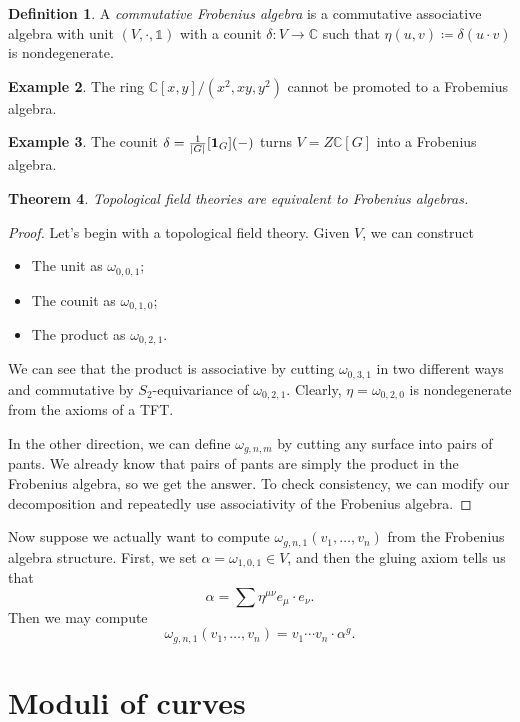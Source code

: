 \documentclass[leqno, openany]{memoir}
\newtheorem{thm}{Theorem}[section]
\theoremstyle{definition}
\newtheorem{defn}[thm]{Definition}
\newtheorem{exm}[thm]{Example}
\theoremstyle{remark}
\theoremstyle{plain}
\theoremstyle{definition}
\theoremstyle{remark}
\newcommand{\C}{\mathbb{C}}
\begin{document}
\begin{defn}
A \textit{commutative Frobenius algebra} is a commutative associative algebra with unit $(V, \cdot, \mathbb{1})$ with a counit $\delta \colon V \to \C$ such that $\eta(u,v) \coloneqq \delta(u \cdot v)$ is nondegenerate.
\end{defn}

\begin{exm}
The ring $\C[x,y]/(x^2,xy,y^2)$ cannot be promoted to a Frobemius algebra.
\end{exm}

\begin{exm}
The counit $\delta = \frac{1}{\abs{G}}[\mathbf{1}_G](-)$ turns $V = Z \C[G]$ into a Frobenius algebra.
\end{exm}

\begin{thm}
Topological field theories are equivalent to Frobenius algebras.
\end{thm}

\begin{proof}
  Let's begin with a topological field theory. Given $V$, we can construct
  \begin{itemize}
  \item The unit as $\omega_{0,0,1}$;
  \item The counit as $\omega_{0,1,0}$;
  \item The product as $\omega_{0,2,1}$.
  \end{itemize}
  We can see that the product is associative by cutting $\omega_{0,3,1}$ in two different ways and commutative by $S_2$-equivariance of $\omega_{0,2,1}$. Clearly, $\eta = \omega_{0,2,0}$ is nondegenerate from the axioms of a TFT.

  In the other direction, we can define $\omega_{g,n,m}$ by cutting any surface into pairs of pants. We already know that pairs of pants are simply the product in the Frobenius algebra, so we get the answer. To check consistency, we can modify our decomposition and repeatedly use associativity of the Frobenius algebra.
\end{proof}

Now suppose we actually want to compute $\omega_{g,n,1}(v_1, \ldots, v_n)$ from the Frobenius algebra structure. First, we set $\alpha = \omega_{1,0,1} \in V$, and then the gluing axiom tells us that
\[ \alpha = \sum \eta^{\mu \nu} e_{\mu} \cdot e_{\nu}. \]
Then we may compute
\[ \omega_{g,n,1}(v_1, \ldots, v_n) = v_1 \cdots v_n \cdot \alpha^g. \]

\section{Moduli of curves}
\label{sec:mgn}
\end{document}
